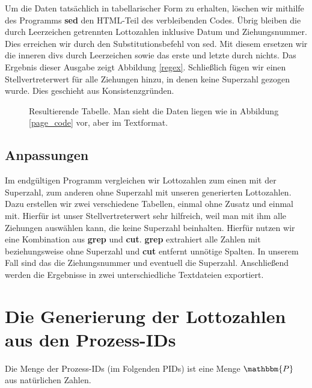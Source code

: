 \documentclass[11pt,a4paper]{article}
\newcommand{\extname}[1]{\mbox{\textbf{#1}}}
\begin{document}
Um die Daten tatsächlich in tabellarischer Form zu erhalten, löschen wir mithilfe des Programms \extname{sed} den HTML-Teil des verbleibenden Codes. Übrig bleiben die durch Leerzeichen getrennten Lottozahlen inklusive Datum und Ziehungsnummer. Dies erreichen wir durch den Substitutionsbefehl von sed. Mit diesem ersetzen wir die inneren divs durch Leerzeichen sowie das erste und letzte durch nichts. Das Ergebnis dieser Ausgabe zeigt Abbildung \ref{regex}.\newline
\newline
Schließlich fügen wir einen Stellvertreterwert für alle Ziehungen hinzu, in denen keine Superzahl gezogen wurde. Dies geschieht aus Konsistenzgründen.
\begin{figure}[htbp]
  \centering
  \fbox{
    
  }
  \caption{Resultierende Tabelle. Man sieht die Daten liegen wie in Abbildung \ref{page_code} vor, aber im Textformat.}
  \label{values}
\end{figure}

\subsection{Anpassungen}
Im endgültigen Programm vergleichen wir Lottozahlen zum einen mit der Superzahl, zum anderen ohne Superzahl mit unseren generierten Lottozahlen. Dazu erstellen wir zwei verschiedene Tabellen, einmal ohne Zusatz und einmal mit. Hierfür ist unser Stellvertreterwert sehr hilfreich, weil man mit ihm alle Ziehungen auswählen kann, die keine Superzahl beinhalten. Hierfür nutzen wir eine Kombination aus \extname{grep} und \extname{cut}. \extname{grep} extrahiert alle Zahlen mit beziehungsweise ohne Superzahl und \extname{cut} entfernt unnötige Spalten. In unserem Fall sind das die Ziehungsnummer und eventuell die Superzahl. Anschließend werden die Ergebnisse in zwei unterschiedliche Textdateien exportiert.


\section{Die Generierung der Lottozahlen aus den Prozess-IDs}

Die Menge der Prozess-IDs (im Folgenden PIDs) ist eine Menge $\mathbbm{P}$ aus natürlichen Zahlen.
\end{document}
